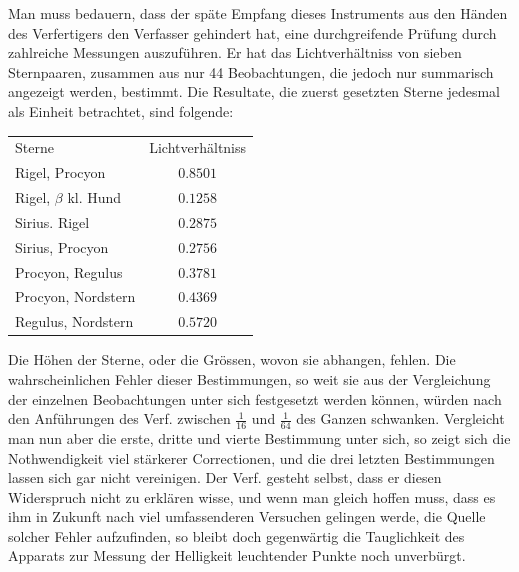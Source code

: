 Man muss bedauern, dass der späte Empfang dieses Instruments aus den Händen des Verfertigers den Verfasser gehindert hat, eine durchgreifende Prüfung durch zahlreiche Messungen auszuführen. Er hat das Lichtverhältniss von sieben Sternpaaren, zusammen aus nur 44 Beobachtungen, die jedoch nur summarisch angezeigt werden, bestimmt. Die Resultate, die zuerst gesetzten Sterne jedesmal als Einheit betrachtet, sind folgende:
\clearpage
\thispagestyle{empty}
\noindent{}%
%
%
\makebox[12mm][r]{}\par\medskip
\begin{center}
\begin{tabular}{lc}
Sterne & Lichtverhältniss\\[3pt]
Rigel, Procyon & $0.8501$\\
Rigel, $\beta$ kl. Hund & $0.1258$\\
Sirius. Rigel & $0.2875$\\
Sirius, Procyon & $0.2756$\\
Procyon, Regulus & $0.3781$\\
Procyon, Nordstern & $0.4369$\\
Regulus, Nordstern & $0.5720$
\end{tabular}
\end{center}

Die Höhen der Sterne, oder die Grössen, wovon sie abhangen, fehlen. Die wahrscheinlichen Fehler dieser Bestimmungen, so weit sie aus der Vergleichung der einzelnen Beobachtungen unter sich festgesetzt werden können, würden nach den Anführungen des Verf. zwischen $\frac{1}{16}$ und $\frac{1}{64}$ des Ganzen schwanken. Vergleicht man nun aber die erste, dritte und vierte Bestimmung unter sich, so zeigt sich die Nothwendigkeit viel stärkerer Correctionen, und die drei letzten Bestimmungen lassen sich gar nicht vereinigen. Der Verf. gesteht selbst, dass er diesen Widerspruch nicht zu erklären wisse, und wenn man gleich hoffen muss, dass es ihm in Zukunft nach viel umfassenderen Versuchen gelingen werde, die Quelle solcher Fehler aufzufinden, so bleibt doch gegenwärtig die Tauglichkeit des Apparats zur Messung der Helligkeit leuchtender Punkte noch unverbürgt.

